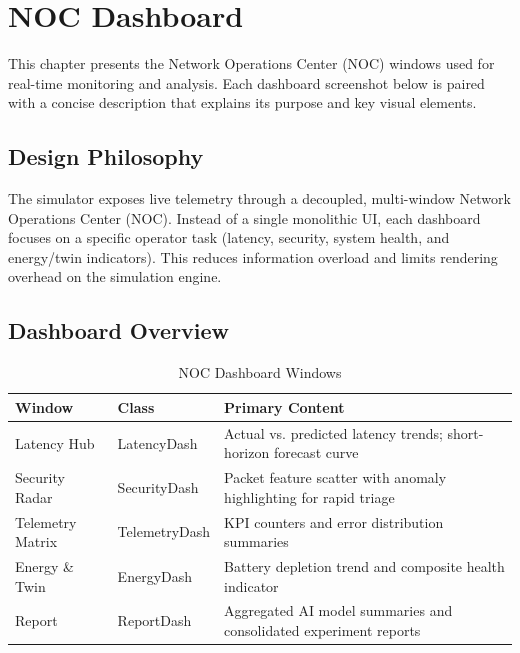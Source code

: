 \chapter{NOC Dashboard}

This chapter presents the Network Operations Center (NOC) windows used for real-time monitoring and analysis. Each dashboard screenshot below is paired with a concise description that explains its purpose and key visual elements.

\section{Design Philosophy}

The simulator exposes live telemetry through a decoupled, multi-window Network Operations Center (NOC). Instead of a single monolithic UI, each dashboard focuses on a specific operator task (latency, security, system health, and energy/twin indicators). This reduces information overload and limits rendering overhead on the simulation engine.

\section{Dashboard Overview}

\begin{table}[H]
\centering
\caption{NOC Dashboard Windows}
\label{tab:dashboards}
\begin{tabularx}{\textwidth}{@{}llX@{}}
\toprule
\textbf{Window} & \textbf{Class} & \textbf{Primary Content} \\
\midrule
Latency Hub & LatencyDash & Actual vs. predicted latency trends; short-horizon forecast curve \\
Security Radar & SecurityDash & Packet feature scatter with anomaly highlighting for rapid triage \\
Telemetry Matrix & TelemetryDash & KPI counters and error distribution summaries \\
Energy \& Twin & EnergyDash & Battery depletion trend and composite health indicator \\
Report & ReportDash & Aggregated AI model summaries and consolidated experiment reports \\
\bottomrule
\end{tabularx}
\end{table}

